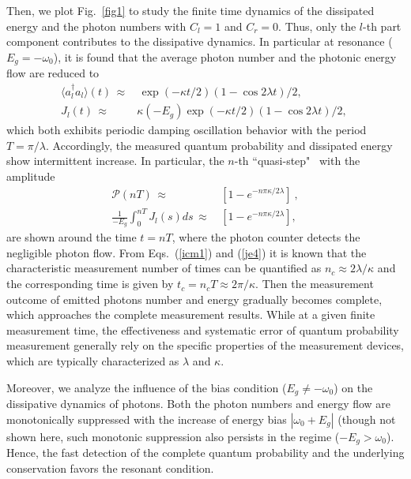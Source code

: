 \documentclass[twocolumn,showpacs,preprintnumbers,amsmath,amssymb]{revtex4}
\begin{document}
	Then, we plot Fig.~\ref{fig1} to study the  finite time dynamics of
	the dissipated energy and
	the photon numbers with $C_l=1$ and $C_r=0$.
	Thus, only the $l$-th part component contributes to the dissipative dynamics.
	In particular at resonance ($E_g=-\omega_0$), it is found that
	the average photon number and
	the photonic energy flow
	are reduced to
	\begin{subequations}
		\begin{align}
			{\langle}a^\dag_{l}{a}_{l}{\rangle}(t) \, \approx& \,  \exp(-{\kappa}t/2)(1-\cos2\lambda{t})/2,~\label{nt}\\
			J_{l}(t) \,  {\approx}\,  &{\kappa}(-E_g)
			\exp(-\kappa{t}/2)(1-\cos2\lambda{t})/2,~\label{je3}
		\end{align}
	\end{subequations}
	which both exhibits periodic damping oscillation behavior with the period $T=\pi/\lambda$.
	Accordingly, the measured quantum probability and dissipated energy  show intermittent increase.
	In particular, the $n$-th ``quasi-step"~\cite{note1} with the amplitude
	\begin{subequations}
		\begin{align}
			\mathscr{P}(nT)
			\,{\approx}\, & [1-e^{-n\pi\kappa/2\lambda}]~\label{icm1},\\
			\frac{1}{-E_{g}}\int^{nT}_0J_{l}(s)ds\, {\approx}\, &
			[1-e^{-n\pi\kappa/2\lambda}],~\label{je4}
		\end{align}
	\end{subequations}
	are shown around the time ${t}=nT$,
	where the photon counter detects the negligible photon flow.
	{From Eqs.~(\ref{icm1}) and (\ref{je4}) it is known that the characteristic measurement number of times can be quantified as $n_{c}{\approx}2\lambda/\kappa$ and the corresponding time is given by
$t_{c}=n_cT{\approx}2\pi/\kappa$. Then the measurement outcome of emitted photons number and energy gradually becomes complete, which approaches the complete measurement results.
While at a given finite measurement time, the effectiveness and systematic error of quantum probability measurement generally rely on the specific properties of the measurement devices, which are typically characterized as $\lambda$ and $\kappa$.
}


	Moreover, we analyze the influence of the bias condition ($E_{g}{\neq}-\omega_{0}$)
	on the dissipative dynamics of photons.
	Both the photon numbers and energy flow
	are monotonically suppressed with the increase of energy bias $|\omega_0+E_g|$
	(though not shown here, such monotonic suppression  also persists in the regime ($-E_g{>}\omega_0$).
	Hence, the fast detection of the complete quantum probability and the underlying conservation  favors the resonant condition.
	
\end{document}
